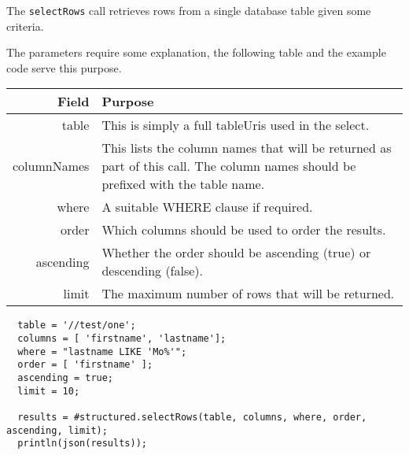 The \verb+selectRows+ call retrieves rows from a single database table given some criteria.

The parameters require some explanation, the following table and the example code serve this purpose.

\begin{table}[H]
\begin{center}
\begin{tabular}{r p{10cm}}
  Field & Purpose \\
  \hline
  table & This is simply a full tableUris used in the select. \\
  columnNames & This lists the column names that will be returned as part of this call. The column names should be prefixed with the table name. \\
  where & A suitable WHERE clause if required. \\
  order & Which columns should be used to order the results. \\
  ascending & Whether the order should be ascending (true) or descending (false). \\
  limit & The maximum number of rows that will be returned. \\
\end{tabular}
\end{center}
\end{table}

\begin{Verbatim}
  table = '//test/one';
  columns = [ 'firstname', 'lastname'];
  where = "lastname LIKE 'Mo%'";
  order = [ 'firstname' ];
  ascending = true;
  limit = 10;

  results = #structured.selectRows(table, columns, where, order, ascending, limit);
  println(json(results));
\end{Verbatim}
